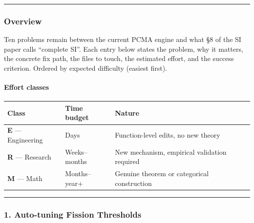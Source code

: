 \documentclass[
  11pt,
  a4paper,
]{article}
\begin{document}
\begin{center}\rule{0.5\linewidth}{0.5pt}\end{center}

\subsubsection{Overview}\label{overview}

Ten problems remain between the current PCMA engine and what §8 of the
SI paper calls ``complete SI''. Each entry below states the problem, why
it matters, the concrete fix path, the files to touch, the estimated
effort, and the success criterion. Ordered by expected difficulty
(easiest first).

\paragraph{Effort classes}\label{effort-classes}

\begin{longtable}[]{@{}
  >{\raggedright\arraybackslash}p{}
  >{\raggedright\arraybackslash}p{}
  >{\raggedright\arraybackslash}p{}@{}}
\toprule\noalign{}
\begin{minipage}[b]{\linewidth}\raggedright
Class
\end{minipage} & \begin{minipage}[b]{\linewidth}\raggedright
Time budget
\end{minipage} & \begin{minipage}[b]{\linewidth}\raggedright
Nature
\end{minipage} \\
\midrule\noalign{}
\endhead
\bottomrule\noalign{}
\endlastfoot
\textbf{E} --- Engineering & Days & Function-level edits, no new
theory \\
\textbf{R} --- Research & Weeks--months & New mechanism, empirical
validation required \\
\textbf{M} --- Math & Months--year+ & Genuine theorem or categorical
construction \\
\end{longtable}

\begin{center}\rule{0.5\linewidth}{0.5pt}\end{center}

\subsubsection{1. Auto-tuning Fission
Thresholds}\label{auto-tuning-fission-thresholds-1}
\end{document}
